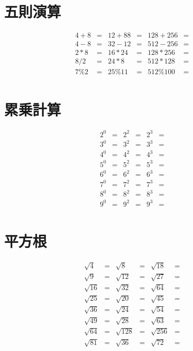 \documentclass[paper=b4j,landscape,twocolumn,fleqn]{jlreq}
\begin{document}
\section{五則演算}
\begin{align*}
  4+8&= & 12+88&= & 128+256&=\\
  4-8&= & 32-12&= & 512-256&=\\
  2*8&= & 16*24&= & 128*256&=\\
  8/2&= & 24*8&= & 512*128&=\\
  7\%2&= & 25\%11&= & 512\%100&=\\
\end{align*}
\section{累乗計算}
\begin{align*}
  2^0&= & 2^2&= & 2^3&=\\
  3^0&= & 3^2&= & 3^3&=\\
  4^0&= & 4^2&= & 4^3&=\\
  5^0&= & 5^2&= & 5^3&=\\
  6^0&= & 6^2&= & 6^3&=\\
  7^0&= & 7^2&= & 7^3&=\\
  8^0&= & 8^2&= & 8^3&=\\
  9^0&= & 9^2&= & 9^3&=\\
\end{align*}
\section{平方根}
\begin{align*}
  \sqrt{4}&= & \sqrt{8}&= & \sqrt{18}&=\\
  \sqrt{9}&= & \sqrt{12}&= & \sqrt{27}&=\\
  \sqrt{16}&= & \sqrt{32}&= & \sqrt{64}&=\\
  \sqrt{25}&= & \sqrt{20}&= & \sqrt{45}&=\\
  \sqrt{36}&= & \sqrt{24}&= & \sqrt{54}&=\\
  \sqrt{49}&= & \sqrt{28}&= & \sqrt{63}&=\\
  \sqrt{64}&= & \sqrt{128}&= & \sqrt{256}&=\\
  \sqrt{81}&= & \sqrt{36}&= & \sqrt{72}&=\\
\end{align*}

\newpage
\end{document}
